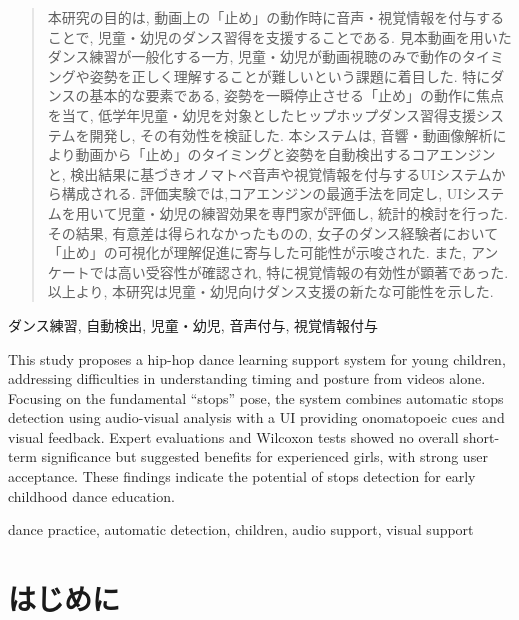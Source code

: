 \documentclass[technicalreport]{ieicej}
\begin{document}
\begin{abstract}
    本研究の目的は, 動画上の「止め」の動作時に音声・視覚情報を付与することで, 児童・幼児のダンス習得を支援することである. 見本動画を用いたダンス練習が一般化する一方, 児童・幼児が動画視聴のみで動作のタイミングや姿勢を正しく理解することが難しいという課題に着目した. 特にダンスの基本的な要素である, 姿勢を一瞬停止させる「止め」の動作に焦点を当て, 低学年児童・幼児を対象としたヒップホップダンス習得支援システムを開発し, その有効性を検証した. 本システムは, 音響・動画像解析により動画から「止め」のタイミングと姿勢を自動検出するコアエンジンと, 検出結果に基づきオノマトペ音声や視覚情報を付与するUIシステムから構成される. 評価実験では,コアエンジンの最適手法を同定し, UIシステムを用いて児童・幼児の練習効果を専門家が評価し, 統計的検討を行った. その結果, 有意差は得られなかったものの, 女子のダンス経験者において「止め」の可視化が理解促進に寄与した可能性が示唆された. また, アンケートでは高い受容性が確認され, 特に視覚情報の有効性が顕著であった. 以上より, 本研究は児童・幼児向けダンス支援の新たな可能性を示した. 
\end{abstract}
\begin{keyword}
    ダンス練習, 自動検出, 児童・幼児, 音声付与, 視覚情報付与
\end{keyword}
\begin{eabstract}
    This study proposes a hip-hop dance learning support system for young children, addressing difficulties in understanding timing and posture from videos alone. Focusing on the fundamental “stops” pose, the system combines automatic stops detection using audio-visual analysis with a UI providing onomatopoeic cues and visual feedback. Expert evaluations and Wilcoxon tests showed no overall short-term significance but suggested benefits for experienced girls, with strong user acceptance. These findings indicate the potential of stops detection for early childhood dance education.
\end{eabstract}
\begin{ekeyword}
    dance practice, automatic detection, children, audio support, visual support
\end{ekeyword}
\maketitle

\section{はじめに}
\end{document}
